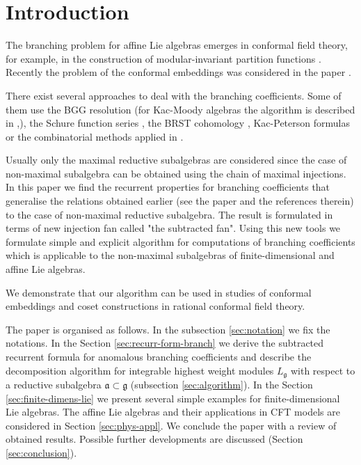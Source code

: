 \documentclass[a4paper,12pt]{article}
\theoremstyle{definition} \newtheorem{Def}{Definition}
\begin{document}
\section{Introduction}
\label{sec:introduction}

The branching problem for affine Lie algebras emerges in conformal field theory, for example, in the construction of modular-invariant partition functions \cite{difrancesco1997cft}. Recently the problem of the conformal embeddings was considered in the paper \cite{coquereaux2008conformal}.

There exist several approaches to deal with the branching coefficients. Some of them use the BGG
resolution \cite{bernstein1975differential} (for Kac-Moody algebras the algorithm is described in
\cite{kac1990idl},\cite{wakimoto2001idl}), the Schure function series \cite{fauser2006new}, the BRST
cohomology \cite{Hwang:1994yr}, Kac-Peterson formulas \cite{kac1990idl,quella2002branching} or the
combinatorial methods applied in \cite{feigin707principal}.

Usually only the maximal reductive subalgebras are considered since the case of non-maximal subalgebra can be obtained using the chain of maximal injections. In this paper we find the recurrent properties for branching coefficients that generalise the relations obtained earlier (see the paper \cite{ilyin812pbc} and the references therein) to the case of non-maximal reductive subalgebra. The result is formulated in terms of new injection fan called "the subtracted fan". Using this new tools we formulate simple and explicit algorithm for computations of branching coefficients which is applicable to the non-maximal subalgebras of finite-dimensional and affine Lie algebras.

We demonstrate that our algorithm can be used in studies of conformal embeddings and coset constructions in rational conformal field theory.

The paper is organised as follows. In the subsection \ref{sec:notation}  we fix the notations. In the Section \ref{sec:recurr-form-branch} we derive the subtracted recurrent formula for anomalous branching coefficients and describe the decomposition algorithm for integrable highest weight modules $L_{\mathfrak{g}}$ with respect to a reductive subalgebra $\mathfrak{a}\subset \mathfrak{g}$ (subsection \ref{sec:algorithm}). In the Section \ref{sec:finite-dimens-lie} we present several simple examples for finite-dimensional Lie algebras. The affine Lie algebras and their applications in CFT models are considered in Section \ref{sec:phys-appl}. We conclude the paper with a review of obtained results. Possible further developments are discussed (Section \ref{sec:conclusion}).
\end{document}
